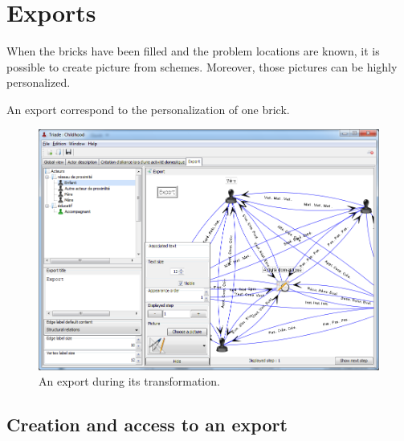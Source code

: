 \chapter{Exports}
\label{export}

When the bricks have been filled and the problem locations are known, it is possible to create picture from schemes. Moreover, those pictures can be highly personalized.

An export correspond to the personalization of one brick.\\


\begin{figure}[h!t]
\centering
\includegraphics[scale=0.45]{images/vue_export.png}

\caption{An export during its transformation.}

\end{figure}


\section{Creation and access to an export}

